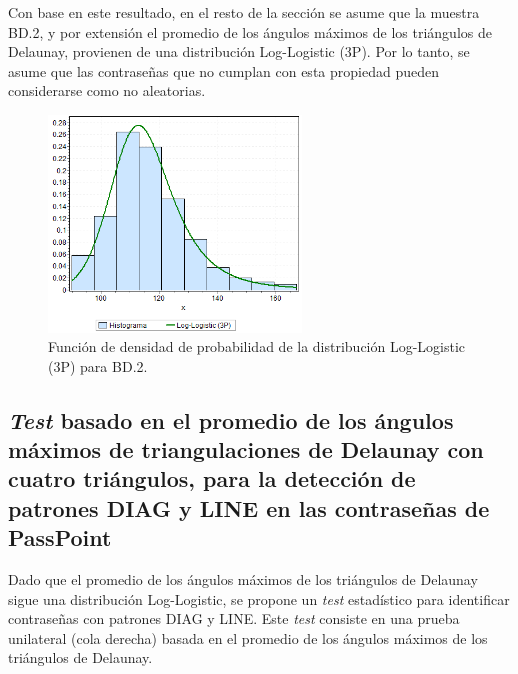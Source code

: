\documentclass[12pt]{report}
\begin{document}
Con base en este resultado, en el resto de la sección se asume que la muestra BD.2, y por extensión el promedio de los ángulos máximos de los triángulos de Delaunay, provienen de una distribución Log-Logistic (3P). Por lo tanto, se asume que las contraseñas que no cumplan con esta propiedad pueden considerarse como no aleatorias.
 
\begin{figure}[ht]
	\centering
	
	\includegraphics[width=0.6\textwidth]{4td_fdp.png}
	\caption{Función de densidad de probabilidad de la  distribución Log-Logistic (3P) para BD.2.}
	\label{4TD_FDP}
\end{figure}
\newpage

\subsection{\textit{Test} basado en el promedio de los ángulos máximos de triangulaciones de Delaunay con cuatro triángulos, para la detección de patrones DIAG y LINE en las contraseñas de PassPoint}

Dado que el promedio de los ángulos máximos de los triángulos de Delaunay sigue una distribución Log-Logistic, se propone un \textit{test} estadístico para identificar contraseñas con patrones DIAG y LINE. Este \textit{test} consiste en una prueba unilateral (cola derecha) basada en el promedio de los ángulos máximos de los triángulos de Delaunay.
\end{document}
